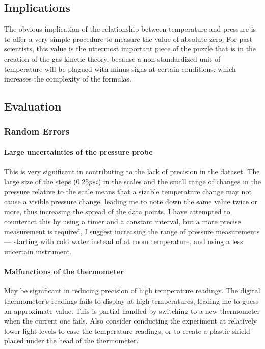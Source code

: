\documentclass[a4paper,12pt]{article}
\begin{document}
\subsection{Implications}
The obvious implication of the relationship between temperature and pressure is to offer a very simple procedure to measure the value of absolute zero. For past scientists, this value is the uttermost important piece of the puzzle that is in the creation of the gas kinetic theory, because a non-standardized unit of temperature will be plagued with minus signs at certain conditions, which increases the complexity of the formulas.

\subsection{Evaluation}


\subsubsection{Random Errors}
\paragraph{Large uncertainties of the pressure probe} This is very significant in contributing to the lack of precision in the dataset. The large size of the steps (0.25$\si{psi}$) in the scales and the small range of changes in the pressure relative to the scale means that a sizable temperature change may not cause a visible pressure change, leading me to note down the same value twice or more, thus increasing the spread of the data points. I have attempted to counteract this by using a timer and a constant interval, but a more precise measurement is required, I suggest increasing the range of pressure measurements --- starting with cold water instead of at room temperature, and using a less uncertain instrument.

\paragraph{Malfunctions of the thermometer}
May be significant in reducing precision of high temperature readings. The digital thermometer's readings fails to display at high temperatures, leading me to guess an approximate value. This is partial handled by switching to a new thermometer when the current one fails. Also consider conducting the experiment at relatively lower light levels to ease the temperature readings; or to create a plastic shield placed under the head of the thermometer.
\end{document}
